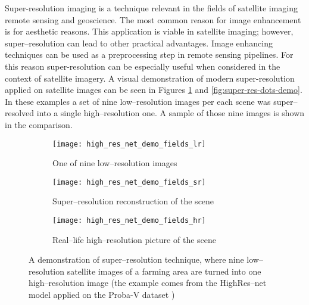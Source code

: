 Super-resolution imaging is a technique relevant in the fields of satellite imaging
remote sensing and geoscience.
The most common reason for image enhancement is for aesthetic reasons.
This application is viable in satellite imaging; however, super--resolution can
lead to other practical advantages.
Image enhancing techniques can be used as a preprocessing step in remote
sensing pipelines.
For this reason super-resolution can be especially useful when considered in
the context of satellite imagery.
A visual demonstration of modern super-resolution applied on satellite images can be seen in Figures \ref{fig:super-res-fields-demo} and \ref{fig:super-res-dots-demo}.
In these examples a set of nine low--resolution images per each scene was super--resolved into a single high--resolution one.
A sample of those nine images is shown in the comparison.
\begin{figure}[p]
    \centering
    \begin{subfigure}[t]{0.32\textwidth}
        \centering
        \texttt{[image: high\_res\_net\_demo\_fields\_lr]}
        \caption{One of nine low--resolution images}
    \end{subfigure}
    \hfill
    \begin{subfigure}[t]{0.32\textwidth}
        \centering
        \texttt{[image: high\_res\_net\_demo\_fields\_sr]}
        \caption{Super--resolution reconstruction of the scene}
    \end{subfigure}
    \hfill
    \begin{subfigure}[t]{0.32\textwidth}
        \centering
        \texttt{[image: high\_res\_net\_demo\_fields\_hr]}
        \caption{Real--life high--resolution picture of the scene}
    \end{subfigure}
    \caption{A demonstration of super--resolution technique, where nine low--resolution satellite images of a farming area are turned into one  high--resolution image (the example comes from the HighRes--net model applied on the Proba-V dataset \cite{deudon-2020-highresnet})}
    \label{fig:super-res-fields-demo}
\end{figure}

